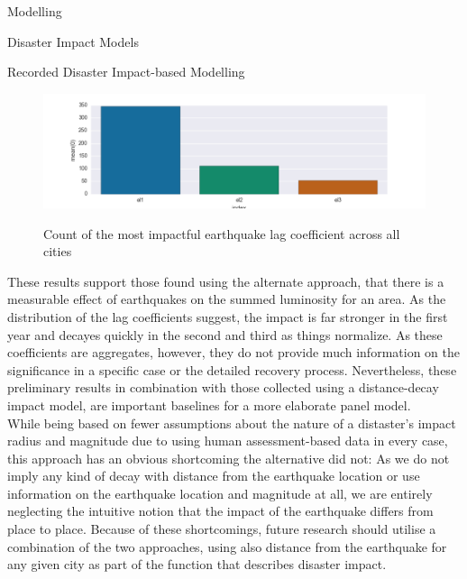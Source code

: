 \documentclass[12.5pt,fleqn,leqno,letterpaper]{article}
\begin{document}
\begin{section}{Modelling}
\begin{subsection}{Disaster Impact Models}
\begin{subsubsection}{Recorded Disaster Impact-based Modelling}
\begin{figure}
      \end{figure}
      \begin{figure}
        \centering
        \includegraphics[width=\linewidth]{non_balanced_earthquake_coefficients_winning_lag}\label{fig:non_balanced_earthquake_winning_lag}
        \caption{Count of the most impactful earthquake lag coefficient across all cities}
      \end{figure}
      These results support those found using the alternate approach, that there is a measurable effect of earthquakes on the summed luminosity for an area. As the distribution of the lag coefficients suggest, the impact is far stronger in the first year and decayes quickly in the second and third as things normalize. As these coefficients are aggregates, however, they do not provide much information on the significance in a specific case or the detailed recovery process. Nevertheless, these preliminary results in combination with those collected using a distance-decay impact model, are important baselines for a more elaborate panel model.\\
      While being based on fewer assumptions about the nature of a distaster's impact radius and magnitude due to using human assessment-based data in every case, this approach has an obvious shortcoming the alternative did not: As we do not imply any kind of decay with distance from the earthquake location or use information on the earthquake location and magnitude at all, we are entirely neglecting the intuitive notion that the impact of the earthquake differs from place to place. Because of these shortcomings, future research should utilise a combination of the two approaches, using also distance from the earthquake for any given city as part of the function that describes disaster impact.
    \end{subsubsection}

  \end{subsection}



\end{section}
\end{document}
